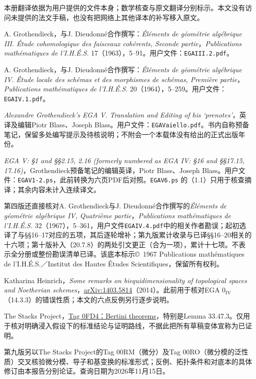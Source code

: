 本册翻译依据为用户提供的文件本身；数学核查与原文翻译分别标示。本文没有访问未提供的法文手稿，也没有把网络上其他译本的补写移入原文。

A. Grothendieck，与J. Dieudonné合作撰写：\textit{Éléments de géométrie algébrique III. Étude cohomologique des faisceaux cohérents, Seconde partie}，\textit{Publications mathématiques de l'I.H.É.S.} 17（1963），5--91。用户文件：\texttt{EGAIII.2.pdf}。

A. Grothendieck，与J. Dieudonné合作撰写：\textit{Éléments de géométrie algébrique IV. Étude locale des schémas et des morphismes de schémas, Première partie}，\textit{Publications mathématiques de l'I.H.É.S.} 20（1964），5--259。用户文件：\texttt{EGAIV.1.pdf}。

\textit{Alexandre Grothendieck's EGA V. Translation and Editing of his `prenotes'}，英译及编辑Piotr Blass、Joseph Blass。用户文件：\texttt{EGAVaiello.pdf}。书内自称预备笔记，保留多处编写提示及待核说明；不附会一个本载体没有给出的正式出版年份。

\textit{EGA V: §1 and §§2.15, 2.16 (formerly numbered as EGA IV: §16 and §§17.15, 17.16)}，Grothendieck预备笔记的编辑英译，Piotr Blass、Joseph Blass。用户文件：\texttt{EGAV1-2.ps}，此前转换为六页PDF后对照。\texttt{EGAV6.ps} 的（1.1）只用于核查摘译；其余内容未计入连续译文。

第四版还直接核对A. Grothendieck与J. Dieudonné合作撰写的\textit{Éléments de géométrie algébrique IV, Quatrième partie}，\textit{Publications mathématiques de l'I.H.É.S.} 32（1967），5--361，用户文件\texttt{EGAIV.4.pdf}中的相关作者勘误；起初选译了与§§16--17对应的五项，其后逐轮增补；第九版累计收录与已译§§16--20相关的十六项；第十版补入（20.7.8）的两处引文更正（合为一项），累计十七项。不表示全分册或整份勘误清单已译。该底本标示\copyright\ 1967 Publications mathématiques de l'I.H.É.S.／Institut des Hautes Études Scientifiques，保留所有权利。

Katharina Heinrich，\textit{Some remarks on biequidimensionality of topological spaces and Noetherian schemes}，\href{https://arxiv.org/abs/1403.5814}{arXiv:1403.5814}（2014）。此前用于核对EGA $0_{\mathrm{IV}}$（14.3.3）的错误性质；本文的六点反例另行逐步说明。

The Stacks Project，\href{https://stacks.math.columbia.edu/tag/0FD4}{Tag 0FD4：Bertini theorems}，特别是Lemma 33.47.3。仅用于核对明确浸入假设下的标准结论与证明路线，不据此把所有草稿变体宣称为已证明。

第九版另以The Stacks Project的Tag 00RM（微分）及Tag 00RO（微分模的泛性质）交叉核验微分模、导子和基变换的标准形式；反例、拓扑条件和对底本的具体修订由本报告分别论证。查询日期为2026年11月15日。

